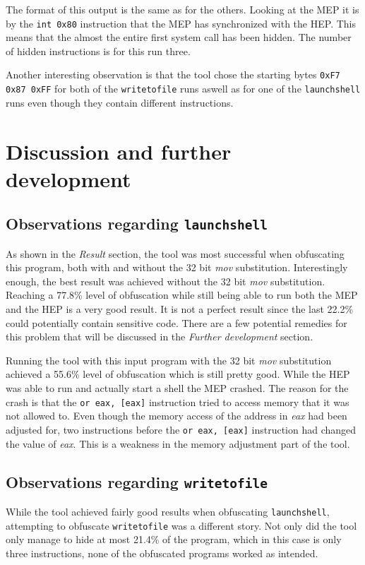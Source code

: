 \documentclass[11pt,twoside]{eitExjobb}
\begin{document}
\noindent The format of this output is the same as for the others. Looking at the MEP it is by the \texttt{int 0x80} instruction that the MEP has synchronized with the HEP. This means that the almost the entire first system call has been hidden. The number of hidden instructions is for this run three.\newline

\noindent Another interesting observation is that the tool chose the starting bytes \texttt{0xF7 0x87 0xFF} for both of the \texttt{writetofile} runs aswell as for one of the \texttt{launchshell} runs even though they contain different instructions. 

\chapter{Discussion and further development}

\section{Observations regarding \texttt{launchshell}}
As shown in the \emph{Result} section, the tool was most successful when obfuscating this program, both with and without the 32 bit \emph{mov} substitution. Interestingly enough, the best result was achieved without the 32 bit \emph{mov} substitution. Reaching a 77.8\% level of obfuscation while still being able to run both the MEP and the HEP is a very good result. It is not a perfect result since the last 22.2\% could potentially contain sensitive code. There are a few potential remedies for this problem that will be discussed in the \emph{Further development} section. 

Running the tool with this input program with the 32 bit \emph{mov} substitution achieved a 55.6\% level of obfuscation which is still pretty good. While the HEP was able to run and actually start a shell the MEP crashed. The reason for the crash is that the \texttt{or eax, [eax]} instruction tried to access memory that it was not allowed to. Even though the memory access of the address in \emph{eax} had been adjusted for, two instructions before the \texttt{or eax, [eax]} instruction had changed the value of \emph{eax}. This is a weakness in the memory adjustment part of the tool.


\section{Observations regarding \texttt{writetofile}}
While the tool achieved fairly good results when obfuscating \texttt{launchshell}, attempting to obfuscate \texttt{writetofile} was a different story. Not only did the tool only manage to hide at most 21.4\% of the program, which in this case is only three instructions, none of the obfuscated programs worked as intended. 
\end{document}

